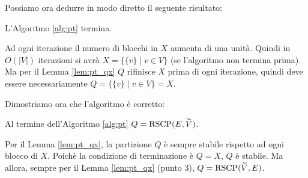Possiamo ora dedurre in modo diretto il seguente risultato:
\begin{corollary}
    L'Algoritmo \ref{alg:pt} termina.
\end{corollary}
\begin{proof2}
    Ad ogni iterazione il numero di blocchi in $X$ aumenta di una unità. Quindi in $O(|V|)$ iterazioni si avrà $X = \{\{v\} \mid v \in V\}$ (se l'algoritmo non termina prima). Ma per il Lemma \ref{lem:pt_qx} $Q$ rifinisce $X$ prima di ogni iterazione, quindi deve essere necessariamente $Q = \{\{v\} \mid v \in V\} = X$.
\end{proof2}
Dimostriamo ora che l'algoritmo è corretto:
\begin{proposition}
    Al termine dell'Algoritmo \ref{alg:pt} $Q = \textup{RSCP}(E,\widetilde{V})$.
\end{proposition}
\begin{proof2}
    Per il Lemma \ref{lem:pt_qx}, la partizione $Q$ è sempre stabile rispetto ad ogni blocco di $X$. Poichè la condizione di terminazione è $Q=X$, $Q$ è stabile. Ma allora, sempre per il Lemma \ref{lem:pt_qx} (punto 3), $Q = \textup{RSCP}(\widetilde{V},E)$.
\end{proof2}


